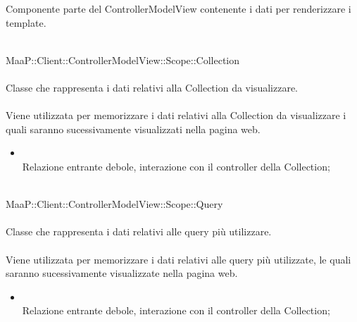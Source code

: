 Componente parte del ControllerModelView contenente i dati per renderizzare i template.

	\\
	MaaP::Client::ControllerModelView::Scope::Collection\\
	\\
	Classe che rappresenta i dati relativi alla Collection da visualizzare.\\
	\\
	Viene utilizzata per memorizzare i dati relativi alla Collection da visualizzare i quali saranno sucessivamente visualizzati nella pagina web.\\
	\begin{itemize}
	\item{}\\
	Relazione entrante debole, interazione con il controller della Collection;
	\end{itemize}
	
	\\
	MaaP::Client::ControllerModelView::Scope::Query\\
	\\
	Classe che rappresenta i dati relativi alle query più utilizzare.\\
	\\
	Viene utilizzata per memorizzare i dati relativi alle query più utilizzate, le quali saranno sucessivamente visualizzate nella pagina web.\\
	\begin{itemize}
	\item{}\\
	Relazione entrante debole, interazione con il controller della Collection;
	\end{itemize}
	
